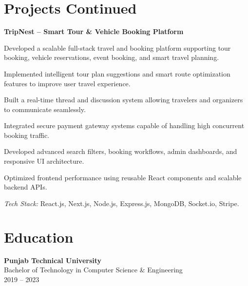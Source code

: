 \documentclass[10pt,a4paper]{moderncv}
\newcommand*{\projecttitle}[1]{\vspace{0.8mm}\textbf{#1}\\[-0.9mm]}
\begin{document}
\begin{minipage}[t]{0.31\textwidth}
\section{Projects Continued}
\projecttitle{TripNest -- Smart Tour \& Vehicle Booking Platform}
\begin{resitemize}
  \item Developed a scalable full-stack travel and booking platform supporting tour booking, vehicle reservations, event booking, and smart travel planning.
  \item Implemented intelligent tour plan suggestions and smart route optimization features to improve user travel experience.
  \item Built a real-time thread and discussion system allowing travelers and organizers to communicate seamlessly.
  \item Integrated secure payment gateway systems capable of handling high concurrent booking traffic.
  \item Developed advanced search filters, booking workflows, admin dashboards, and responsive UI architecture.
  \item Optimized frontend performance using reusable React components and scalable backend APIs.
  \item \textit{Tech Stack:} React.js, Next.js, Node.js, Express.js, MongoDB, Socket.io, Stripe.
\end{resitemize}

\section{Education}
\textbf{Punjab Technical University}\\[-0.3mm]
Bachelor of Technology in Computer Science \& Engineering\\[-0.3mm]
2019 -- 2023

\end{minipage}
\end{document}
